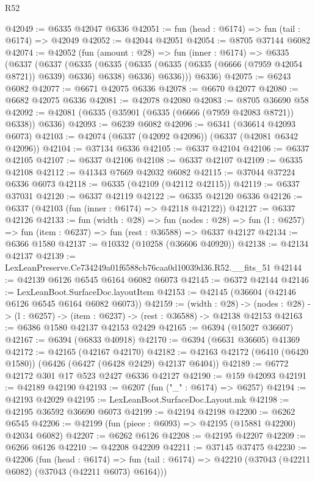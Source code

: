 \begin{lexlean}{R52}
\begin{coremodule}
@42049 := @6335 @42047 @6336
@42051 := fun (head : @6174) => fun (tail : @6174) => @42049
@42052 := @42044 @42051
@42054 := @8705 @37144 @6082
@42074 := @42052
    (fun (amount : @28) =>
    fun (inner : @6174) =>
    @6335
      (@6337
        (@6337
          (@6335
            (@6335 (@6335 (@6335 (@6335 (@6666 (@7959 @42054 @8721)) @6339) @6336) @6338) @6336)
            @6336)))
      @6336)
@42075 := @6243 @6082
@42077 := @6671 @42075 @6336
@42078 := @6670 @42077
@42080 := @6682 @42075 @6336
@42081 := @42078 @42080
@42083 := @8705 @36690 @58
@42092 := @42081 (@6335 (@35901 (@6335 (@6666 (@7959 @42083 @8721)) @6338)) @6336)
@42093 := @6239 @6082
@42096 := @6341 (@36614 @42093 @6073)
@42103 := @42074 (@6337 (@42092 @42096)) (@6337 (@42081 @6342 @42096))
@42104 := @37134 @6336
@42105 := @6337 @42104
@42106 := @6337 @42105
@42107 := @6337 @42106
@42108 := @6337 @42107
@42109 := @6335 @42108
@42112 := @41343 @7669 @42032 @6082
@42115 := @37044 @37224 @6336 @6073
@42118 := @6335 (@42109 (@42112 @42115))
@42119 := @6337 @37031
@42120 := @6337 @42119
@42122 := @6335 @42120 @6336
@42126 := @6337 (@42103 (fun (inner : @6174) => @42118 @42122))
@42127 := @6337 @42126
@42133 := fun (width : @28) =>
  fun (nodes : @28) => fun (l : @6257) => fun (item : @6237) => fun (rest : @36588) => @6337 @42127
@42134 := @6366 @1580
@42137 := @10332 (@10258 (@36606 @40920))
@42138 := @42134 @42137
@42139 := LexLeanPreserve.Ce734249a01f6588cb76caa0d10039d36.R52.__fits_51
@42144 := @42139 @6126 @6545 @6164 @6082 @6073
@42145 := @6372 @42144
@42146 := LexLeanBoot.SurfaceDoc.layoutItem
@42153 := @42145 (@36604 (@42146 @6126 @6545 @6164 @6082 @6073))
@42159 := (width : @28) ->
  (nodes : @28) -> (l : @6257) -> (item : @6237) -> (rest : @36588) -> @42138 @42153
@42163 := @6386 @1580 @42137 @42153 @2429
@42165 := @6394 (@15027 @36607)
@42167 := @6394 (@6833 @40918)
@42170 := @6394 (@6631 @36605) @41369
@42172 := @42165 (@42167 @42170)
@42182 := @42163 @42172 (@6410 (@6420 @1580)) (@6426 (@6427 (@6428 @2429) @42137 @6404))
@42189 := @6772 @42172 @301 @17 @523 @2427 @6336 @42127
@42190 := @159 @42093
@42191 := @42189 @42190
@42193 := @6207 (fun ("_" : @6174) => @6257)
@42194 := @42193 @42029
@42195 := LexLeanBoot.SurfaceDoc.Layout.mk
@42198 := @42195 @36592 @36690 @6073
@42199 := @42194 @42198
@42200 := @6262 @6545
@42206 := @42199 (fun (piece : @6093) => @42195 (@15881 @42200) @42034 @6082)
@42207 := @6262 @6126
@42208 := @42195 @42207
@42209 := @6266 @6126
@42210 := @42208 @42209
@42211 := @37145 @37475
@42230 := @42206
    (fun (head : @6174) =>
    fun (tail : @6174) => @42210 (@37043 (@42211 @6082) (@37043 (@42211 @6073) @6164)))

\end{coremodule}
\end{lexlean}
